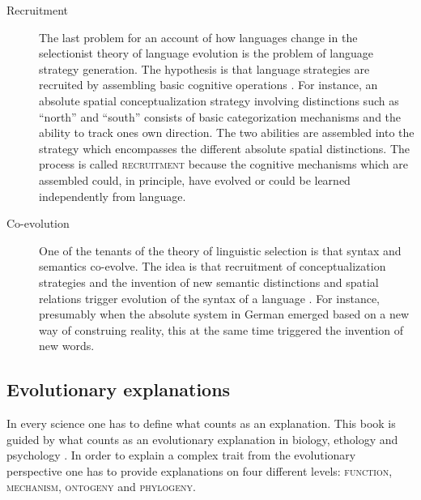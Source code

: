 \begin{description}
\item[Recruitment]
The last problem for an account of how languages change in the 
selectionist theory of language evolution is the problem of language strategy
generation. The hypothesis is that language strategies are recruited by assembling
basic cognitive operations \citep{steels2007recruitment}. For instance, an 
absolute spatial conceptualization strategy
involving distinctions such as ``north'' and ``south''  consists of basic categorization
mechanisms and the ability to track ones own direction. The two abilities are assembled
into the strategy which encompasses the different absolute spatial distinctions.
The process is called \textsc{recruitment} because the cognitive mechanisms which
are assembled could, in principle, have evolved or could be learned independently 
from language. 

\item[Co-evolution] 
One of the tenants of the theory of linguistic selection is that syntax and semantics co-evolve. 
The idea is that recruitment of conceptualization strategies and the invention of new
semantic distinctions and spatial relations trigger evolution of the syntax of a language
\citep{steels1997distinctions,steels1998synthesizing}.  
For instance, presumably when the absolute system in German emerged based
on a new way of construing reality, this at the same time triggered 
the invention of new words. 
\end{description}

\subsection{Evolutionary explanations}
In every science one has to define what counts as an explanation. 
This book is guided by what counts as an evolutionary explanation
in biology, ethology and psychology \citep{tinbergen1963aims,dunbar1998theory}. 
In order to explain a complex trait from the evolutionary perspective 
one has to provide explanations on four different levels: \textsc{function}, 
\textsc{mechanism}, \textsc{ontogeny} and \textsc{phylogeny}.


